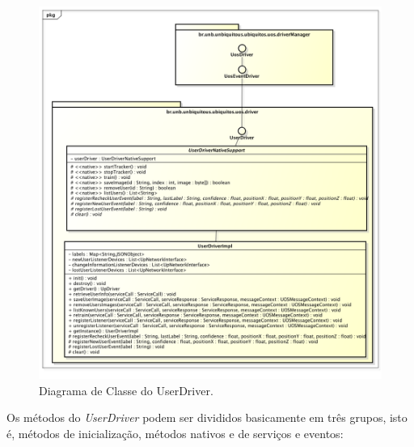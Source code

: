 	\begin{figure}[htb]
		\begin{center}
			\includegraphics[scale=0.45]{figuras/4.ProblemaEProposta/diagrama-classe-userdriver.png}
		\end{center}
		\caption{Diagrama de Classe do UserDriver.}
		\label{fig:userdriver}
	\end{figure}

Os métodos do \textit{UserDriver} podem ser divididos basicamente em três grupos, isto é, métodos de inicialização, métodos nativos e de serviços e eventos:

